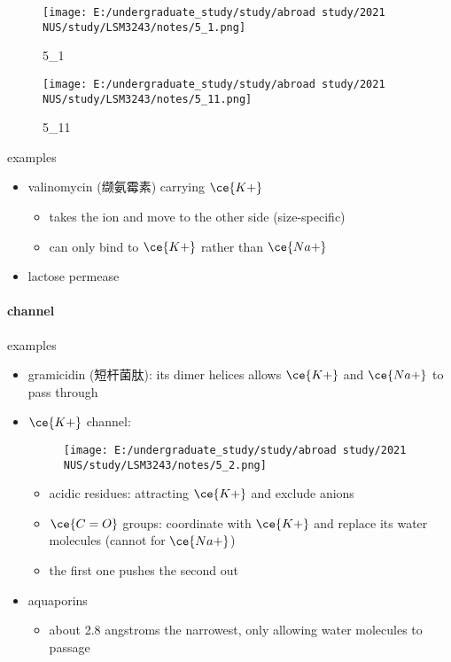 \documentclass[]{article}
\let\oldparagraph\paragraph
\renewcommand{\paragraph}[1]{\oldparagraph{#1}\mbox{}}
\begin{document}
\begin{figure}
\centering
\texttt{[image: E:/undergraduate\_study/study/abroad study/2021 NUS/study/LSM3243/notes/5\_1.png]}
\caption{5\_1}
\end{figure}

\begin{figure}
\centering
\texttt{[image: E:/undergraduate\_study/study/abroad study/2021 NUS/study/LSM3243/notes/5\_11.png]}
\caption{5\_11}
\end{figure}

examples

\begin{itemize}
\item
  valinomycin (缬氨霉素) carrying \(\ce{K+}\)

  \begin{itemize}
  \item
    takes the ion and move to the other side (size-specific)
  \item
    can only bind to \(\ce{K+}\) rather than \(\ce{Na+}\)
  \end{itemize}
\item
  lactose permease
\end{itemize}

\hypertarget{channel}{%
\paragraph{channel}\label{channel}}

examples

\begin{itemize}
\item
  gramicidin (短杆菌肽): its dimer helices allows \(\ce{K+}\) and
  \(\ce{Na+}\) to pass through
\item
  \(\ce{K+}\) channel:

  \begin{figure}
  \centering
  \texttt{[image: E:/undergraduate\_study/study/abroad study/2021 NUS/study/LSM3243/notes/5\_2.png]}
  \caption{}
  \end{figure}

  \begin{itemize}
  \item
    acidic residues: attracting \(\ce{K+}\) and exclude anions
  \item
    \(\ce{C=O}\) groups: coordinate with \(\ce{K+}\) and replace its
    water molecules (cannot for \(\ce{Na+}\))
  \item
    the first one pushes the second out
  \end{itemize}
\item
  aquaporins

  \begin{itemize}
  \item
    about 2.8 angstroms the narrowest, only allowing water molecules to
    passage
  \end{itemize}
\end{itemize}
\end{document}
